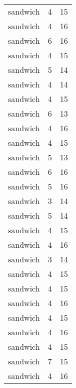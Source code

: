 \begin{table}
\begin{tabular}{lrr}
                        sandwich &         4 &        15 \\
                        sandwich &         4 &        16 \\
                        sandwich &         6 &        16 \\
                        sandwich &         4 &        15 \\
                        sandwich &         5 &        14 \\
                        sandwich &         4 &        14 \\
                        sandwich &         4 &        15 \\
                        sandwich &         6 &        13 \\
                        sandwich &         4 &        16 \\
                        sandwich &         4 &        15 \\
                        sandwich &         5 &        13 \\
                        sandwich &         6 &        16 \\
                        sandwich &         5 &        16 \\
                        sandwich &         3 &        14 \\
                        sandwich &         5 &        14 \\
                        sandwich &         4 &        15 \\
                        sandwich &         4 &        16 \\
                        sandwich &         3 &        14 \\
                        sandwich &         4 &        15 \\
                        sandwich &         4 &        15 \\
                        sandwich &         4 &        16 \\
                        sandwich &         4 &        15 \\
                        sandwich &         4 &        16 \\
                        sandwich &         4 &        15 \\
                        sandwich &         7 &        15 \\
                        sandwich &         4 &        16 \\

\end{tabular}
\end{table}
